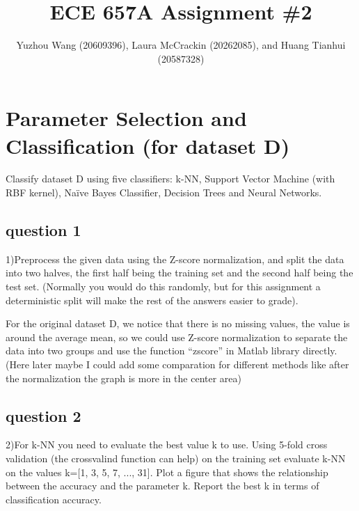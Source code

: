 \documentclass[]{article}
\title{ECE 657A Assignment \#2}
\author{Yuzhou Wang (20609396), Laura McCrackin (20262085), \newline and   Huang Tianhui (20587328)       }
\begin{document}
\maketitle



\section{Parameter Selection and Classification (for dataset D)}
Classify dataset D using five classifiers: k-NN, Support Vector Machine (with RBF kernel), Naïve Bayes Classifier, Decision Trees and Neural Networks. 
\subsection{question 1}
1)Preprocess the given data using the Z-score normalization, and split the data into two halves, the first half being the training set and the second half being the test set. (Normally you would do this randomly, but for this assignment a deterministic split will make the rest of the answers easier to grade).

For the original dataset D, we notice that there is no missing values, the value is around the average mean, so we could use Z-score normalization to separate the data into two groups and use the function “zscore” in Matlab library directly.
(Here later maybe I could add some comparation for different methods like after the normalization the graph is more in the center area)


\subsection{question 2}
2)For k-NN you need to evaluate the best value k to use. Using 5-fold cross validation (the crossvalind function can help) on the training set evaluate k-NN on the values k=[1, 3, 5, 7, ..., 31]. Plot a figure that shows the relationship between the accuracy and the parameter k. Report the best k in terms of classification accuracy.
\end{document}
